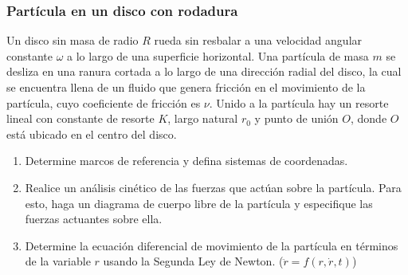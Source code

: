 \subsubsection{Partícula en un disco con rodadura}

Un disco sin masa de radio $R$ rueda sin resbalar a una velocidad angular constante $\omega$ a lo largo de una superficie horizontal. Una partícula de masa $m$ se desliza en una ranura cortada a lo largo de una dirección radial del disco, la cual se encuentra llena de un fluido que genera fricción en el movimiento de la partícula, cuyo coeficiente de fricción es $\nu$. Unido a la partícula hay un resorte lineal con constante de resorte $K$, largo natural $r_0$ y punto de unión $O$, donde $O$ está ubicado en el centro del disco.

\begin{enumerate}[label=(\alph*)]
    \item Determine marcos de referencia y defina sistemas de coordenadas.
    \item Realice un análisis cinético de las fuerzas que actúan sobre la partícula. Para esto, haga un diagrama de cuerpo libre de la partícula y especifique las fuerzas actuantes sobre ella.
    \item Determine la ecuación diferencial de movimiento de la partícula en términos de la variable $r$ usando la Segunda Ley de Newton. ($\ddot{r}=f(r,\dot r,t)$)
\end{enumerate}

